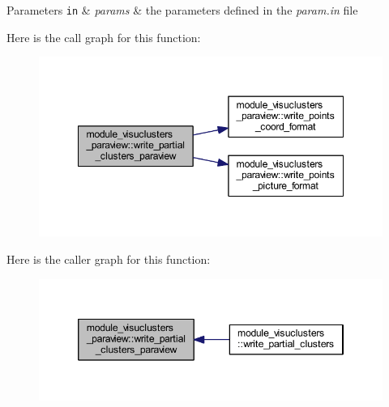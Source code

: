 \begin{DoxyParams}[1]{Parameters}
\mbox{\tt in}  & {\em params} & the parameters defined in the \textit{param.in} file \\
\hline
\end{DoxyParams}


Here is the call graph for this function\+:\nopagebreak
\begin{figure}[H]
\begin{center}
\leavevmode
\includegraphics[width=348pt]{namespacemodule__visuclusters__paraview_abed87b4c957689d9cfdc62811f3b213b_cgraph}
\end{center}
\end{figure}




Here is the caller graph for this function\+:\nopagebreak
\begin{figure}[H]
\begin{center}
\leavevmode
\includegraphics[width=346pt]{namespacemodule__visuclusters__paraview_abed87b4c957689d9cfdc62811f3b213b_icgraph}
\end{center}
\end{figure}


\hypertarget{namespacemodule__visuclusters__paraview_a57010b34c7586dcf52fb9f50e2e1d7aa}{}
